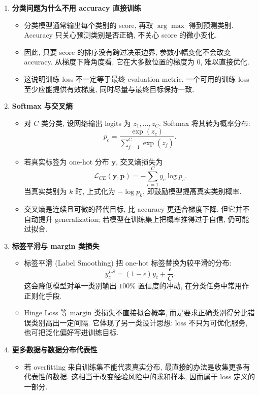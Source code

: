 \documentclass{../nndlcourse}
\begin{document}
\begin{enumerate}
  \item \textbf{分类问题为什么不用 accuracy 直接训练}
    \begin{itemize}
      \item 分类模型通常输出每个类别的 score, 再取 $\arg\max$ 得到预测类别. Accuracy 只关心预测类别是否正确, 不关心 score 的微小变化.
      \item 因此, 只要 score 的排序没有跨过决策边界, 参数小幅变化不会改变 accuracy. 从梯度下降角度看, 它在大多数位置的梯度为 0, 难以直接优化.
      \item 这说明训练 loss 不一定等于最终 evaluation metric. 一个可用的训练 loss 至少应能提供有效梯度, 同时尽量与最终目标保持一致.
    \end{itemize}
  \item \textbf{Softmax 与交叉熵}
    \begin{itemize}
      \item 对 $C$ 类分类, 设网络输出 logits 为 $z_1,\dots,z_C$. Softmax 将其转为概率分布:
      \[
        p_c = \frac{\exp(z_c)}{\sum_{j=1}^{C}\exp(z_j)}.
      \]
      \item 若真实标签为 one-hot 分布 $\boldsymbol{y}$, 交叉熵损失为
      \[
        \mathcal{L}_{CE}(\boldsymbol{y},\boldsymbol{p})
        =
        -\sum_{c=1}^{C} y_c \log p_c.
      \]
      当真实类别为 $k$ 时, 上式化为 $-\log p_k$, 即鼓励模型提高真实类别概率.
      \item 交叉熵是连续且可微的替代目标, 比 accuracy 更适合梯度下降. 但它并不自动提升 generalization; 若模型在训练集上把概率推得过于自信, 仍可能过拟合.
    \end{itemize}
  \item \textbf{标签平滑与 margin 类损失}
    \begin{itemize}
      \item 标签平滑 (Label Smoothing) 把 one-hot 标签替换为较平滑的分布:
      \[
        y_c^{LS}
        =
        (1-\epsilon)y_c + \frac{\epsilon}{C}.
      \]
      这会降低模型对单一类别输出 $100\%$ 置信度的冲动, 在分类任务中常用作正则化手段.
      \item Hinge Loss 等 margin 类损失不直接拟合概率, 而是要求正确类别得分比错误类别高出一定间隔. 它体现了另一类设计思想: loss 不只为可优化服务, 也可把泛化偏好写进训练目标.
    \end{itemize}
  \item \textbf{更多数据与数据分布代表性}
    \begin{itemize}
      \item 若 overfitting 来自训练集不能代表真实分布, 最直接的办法是收集更多有代表性的数据. 这相当于改变经验风险中的求和样本, 因而属于 loss 定义的一部分.

\end{itemize}
\end{enumerate}
\end{document}
